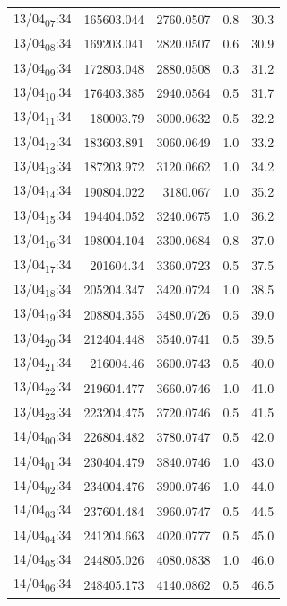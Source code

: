 \documentclass[11pt]{article}
\begin{document}
\begin{center}
\begin{tabular}{lrrrr}
13/04\textsubscript{07}:34 & 165603.044 & 2760.0507 & 0.8 & 30.3\\[0pt]
13/04\textsubscript{08}:34 & 169203.041 & 2820.0507 & 0.6 & 30.9\\[0pt]
13/04\textsubscript{09}:34 & 172803.048 & 2880.0508 & 0.3 & 31.2\\[0pt]
13/04\textsubscript{10}:34 & 176403.385 & 2940.0564 & 0.5 & 31.7\\[0pt]
13/04\textsubscript{11}:34 & 180003.79 & 3000.0632 & 0.5 & 32.2\\[0pt]
13/04\textsubscript{12}:34 & 183603.891 & 3060.0649 & 1.0 & 33.2\\[0pt]
13/04\textsubscript{13}:34 & 187203.972 & 3120.0662 & 1.0 & 34.2\\[0pt]
13/04\textsubscript{14}:34 & 190804.022 & 3180.067 & 1.0 & 35.2\\[0pt]
13/04\textsubscript{15}:34 & 194404.052 & 3240.0675 & 1.0 & 36.2\\[0pt]
13/04\textsubscript{16}:34 & 198004.104 & 3300.0684 & 0.8 & 37.0\\[0pt]
13/04\textsubscript{17}:34 & 201604.34 & 3360.0723 & 0.5 & 37.5\\[0pt]
13/04\textsubscript{18}:34 & 205204.347 & 3420.0724 & 1.0 & 38.5\\[0pt]
13/04\textsubscript{19}:34 & 208804.355 & 3480.0726 & 0.5 & 39.0\\[0pt]
13/04\textsubscript{20}:34 & 212404.448 & 3540.0741 & 0.5 & 39.5\\[0pt]
13/04\textsubscript{21}:34 & 216004.46 & 3600.0743 & 0.5 & 40.0\\[0pt]
13/04\textsubscript{22}:34 & 219604.477 & 3660.0746 & 1.0 & 41.0\\[0pt]
13/04\textsubscript{23}:34 & 223204.475 & 3720.0746 & 0.5 & 41.5\\[0pt]
14/04\textsubscript{00}:34 & 226804.482 & 3780.0747 & 0.5 & 42.0\\[0pt]
14/04\textsubscript{01}:34 & 230404.479 & 3840.0746 & 1.0 & 43.0\\[0pt]
14/04\textsubscript{02}:34 & 234004.476 & 3900.0746 & 1.0 & 44.0\\[0pt]
14/04\textsubscript{03}:34 & 237604.484 & 3960.0747 & 0.5 & 44.5\\[0pt]
14/04\textsubscript{04}:34 & 241204.663 & 4020.0777 & 0.5 & 45.0\\[0pt]
14/04\textsubscript{05}:34 & 244805.026 & 4080.0838 & 1.0 & 46.0\\[0pt]
14/04\textsubscript{06}:34 & 248405.173 & 4140.0862 & 0.5 & 46.5\\[0pt]

\end{tabular}
\end{center}
\end{document}
